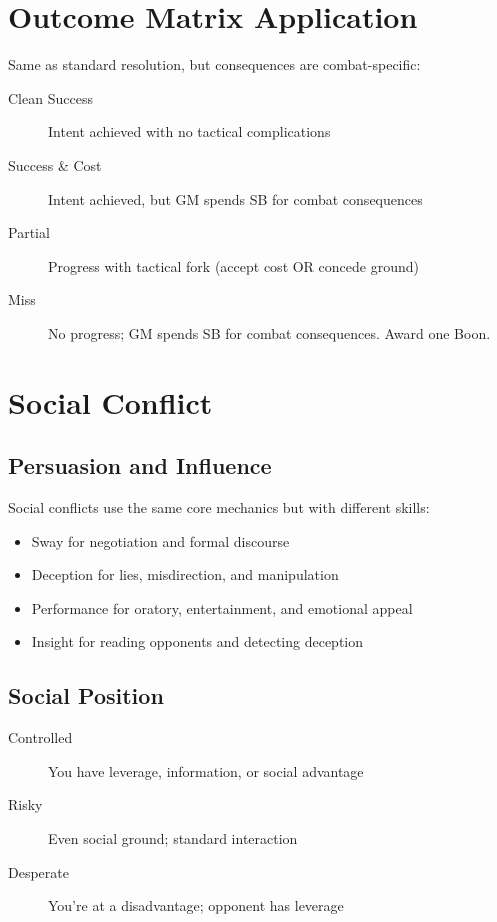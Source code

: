 \section{Outcome Matrix Application}
Same as standard resolution, but consequences are combat-specific:
\begin{description}
\item[Clean Success] Intent achieved with no tactical complications
\item[Success \& Cost] Intent achieved, but GM spends SB for combat consequences
\item[Partial] Progress with tactical fork (accept cost OR concede ground)
\item[Miss] No progress; GM spends SB for combat consequences. Award one Boon. 
\end{description}

\section{Social Conflict}

\subsection{Persuasion and Influence}
Social conflicts use the same core mechanics but with different skills:
\begin{itemize}
\item Sway for negotiation and formal discourse
\item Deception for lies, misdirection, and manipulation
\item Performance for oratory, entertainment, and emotional appeal
\item Insight for reading opponents and detecting deception
\end{itemize}

\subsection{Social Position}
\begin{description}
\item[Controlled] You have leverage, information, or social advantage
\item[Risky] Even social ground; standard interaction
\item[Desperate] You're at a disadvantage; opponent has leverage
\end{description}

